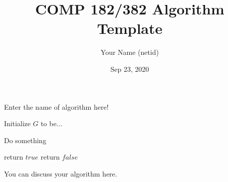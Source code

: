 \documentclass[12pt]{article}
\title{COMP 182/382 Algorithm Template}
\author{Your Name (netid)}
\date{Sep 23, 2020}
\begin{document}
\maketitle

\begin{algorithm}
    \caption{Enter the name of algorithm here!}


    Initialize $G$ to be...\;

    {
        Do something\;
    }

    {
        return $true$\;
    }
    \Else
    {
        return $false$\;
    }
\end{algorithm}

You can discuss your algorithm here.
\end{document}
